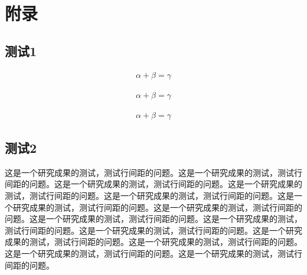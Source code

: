 \documentclass{NauThesis}
\begin{document}


\appendix
\chapter*{附\quad 录}
\addtocounter{figure}{0}
\addtocounter{table}{0}
\addtocounter{equation}{0}

\section*{测试1}
\begin{equation}
\begin{aligned}
  \alpha + \beta = \gamma
\end{aligned}
\end{equation}

\begin{equation}
\begin{aligned}
    \alpha + \beta = \gamma
\end{aligned}
\end{equation}

\begin{equation}
\begin{aligned}
    \alpha + \beta = \gamma
\end{aligned}
\end{equation}
\section*{测试2}

\begin{ResearchAchievements}
    这是一个研究成果的测试，测试行间距的问题。这是一个研究成果的测试，测试行间距的问题。这是一个研究成果的测试，测试行间距的问题。这是一个研究成果的测试，测试行间距的问题。这是一个研究成果的测试，测试行间距的问题。这是一个研究成果的测试，测试行间距的问题。这是一个研究成果的测试，测试行间距的问题。这是一个研究成果的测试，测试行间距的问题。这是一个研究成果的测试，测试行间距的问题。这是一个研究成果的测试，测试行间距的问题。这是一个研究成果的测试，测试行间距的问题。这是一个研究成果的测试，测试行间距的问题。这是一个研究成果的测试，测试行间距的问题。这是一个研究成果的测试，测试行间距的问题。
\end{ResearchAchievements}
\end{document}
